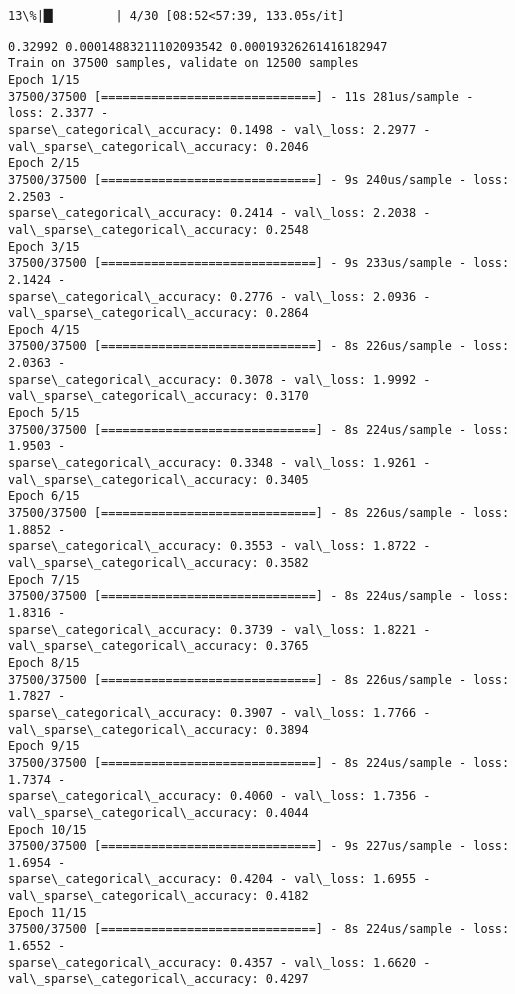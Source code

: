 \documentclass[11pt]{article}
\begin{document}
    \begin{Verbatim}[commandchars=\\\{\}]
 13\%|█▎        | 4/30 [08:52<57:39, 133.05s/it]
    \end{Verbatim}

    \begin{Verbatim}[commandchars=\\\{\}]
0.32992 0.00014883211102093542 0.00019326261416182947
Train on 37500 samples, validate on 12500 samples
Epoch 1/15
37500/37500 [==============================] - 11s 281us/sample - loss: 2.3377 -
sparse\_categorical\_accuracy: 0.1498 - val\_loss: 2.2977 -
val\_sparse\_categorical\_accuracy: 0.2046
Epoch 2/15
37500/37500 [==============================] - 9s 240us/sample - loss: 2.2503 -
sparse\_categorical\_accuracy: 0.2414 - val\_loss: 2.2038 -
val\_sparse\_categorical\_accuracy: 0.2548
Epoch 3/15
37500/37500 [==============================] - 9s 233us/sample - loss: 2.1424 -
sparse\_categorical\_accuracy: 0.2776 - val\_loss: 2.0936 -
val\_sparse\_categorical\_accuracy: 0.2864
Epoch 4/15
37500/37500 [==============================] - 8s 226us/sample - loss: 2.0363 -
sparse\_categorical\_accuracy: 0.3078 - val\_loss: 1.9992 -
val\_sparse\_categorical\_accuracy: 0.3170
Epoch 5/15
37500/37500 [==============================] - 8s 224us/sample - loss: 1.9503 -
sparse\_categorical\_accuracy: 0.3348 - val\_loss: 1.9261 -
val\_sparse\_categorical\_accuracy: 0.3405
Epoch 6/15
37500/37500 [==============================] - 8s 226us/sample - loss: 1.8852 -
sparse\_categorical\_accuracy: 0.3553 - val\_loss: 1.8722 -
val\_sparse\_categorical\_accuracy: 0.3582
Epoch 7/15
37500/37500 [==============================] - 8s 224us/sample - loss: 1.8316 -
sparse\_categorical\_accuracy: 0.3739 - val\_loss: 1.8221 -
val\_sparse\_categorical\_accuracy: 0.3765
Epoch 8/15
37500/37500 [==============================] - 8s 226us/sample - loss: 1.7827 -
sparse\_categorical\_accuracy: 0.3907 - val\_loss: 1.7766 -
val\_sparse\_categorical\_accuracy: 0.3894
Epoch 9/15
37500/37500 [==============================] - 8s 224us/sample - loss: 1.7374 -
sparse\_categorical\_accuracy: 0.4060 - val\_loss: 1.7356 -
val\_sparse\_categorical\_accuracy: 0.4044
Epoch 10/15
37500/37500 [==============================] - 9s 227us/sample - loss: 1.6954 -
sparse\_categorical\_accuracy: 0.4204 - val\_loss: 1.6955 -
val\_sparse\_categorical\_accuracy: 0.4182
Epoch 11/15
37500/37500 [==============================] - 8s 224us/sample - loss: 1.6552 -
sparse\_categorical\_accuracy: 0.4357 - val\_loss: 1.6620 -
val\_sparse\_categorical\_accuracy: 0.4297

\end{Verbatim}
\end{document}
